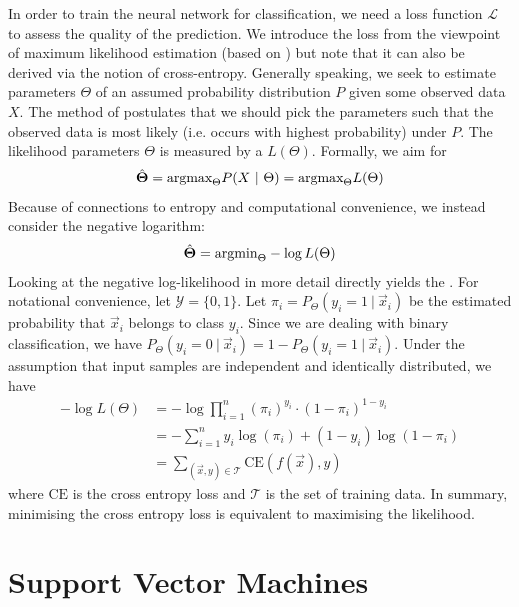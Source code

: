 \documentclass[
	fontsize=10pt, %
	twoside=false, %
	secnumdepth=1, %
  toc=indentunnumbered %
]{kaobook}
\begin{document}
In order to train the neural network for classification, we need a loss function
$\mathcal{L}$ to assess the quality of the prediction. We introduce the
 loss from the viewpoint of maximum likelihood
estimation (based on \cite{zhang_dive_nodate}) but note that it can also be
derived via the notion of cross-entropy.
%
Generally speaking, we seek to estimate parameters $\Theta$ of an assumed
probability distribution $P$ given some observed data $X$. The method of
 postulates that we should pick the
parameters such that the observed data is most likely (i.e. occurs with highest
probability) under $P$. The likelihood \wrt parameters $\Theta$ is measured by
a  $L(\Theta)$.
Formally, we aim for
\begin{align}
  \hat \Theta = \argmax_\Theta P(X~|~\Theta) = \argmax_\Theta L(\Theta)
\end{align}
Because of connections to entropy and computational convenience, we instead
consider the negative logarithm:
\begin{align}
  \hat \Theta = \argmin_\Theta -\log L(\Theta)
\end{align}
Looking at the negative log-likelihood in more detail directly yields the
.
For notational convenience, let $\mathcal{Y} =
\{0,1\}$. Let $\pi_i = P_\Theta(y_i=1~|~\vec x_i)$ be the estimated probability
that $\vec x_i$ belongs to class $y_i$. Since we are dealing with binary
classification, we have $P_\Theta(y_i=0~|~\vec x_i) = 1 - P_\Theta(y_i=1~|~\vec
x_i)$. Under the assumption that input samples are independent and identically
distributed, we have
\begin{align*}
  -\log L(\Theta)  &= -\log \prod_{i=1}^n (\pi_i)^{y_i} \cdot (1-\pi_i)^{1-y_i} \\
  &= - \sum_{i=1}^n y_i \log(\pi_i) + (1-y_i) \log(1-\pi_i) \\
  &= \sum_{(\vec x,y) \in \mathcal{T}} \text{CE}(f(\vec x), y)
    \label{eq:bce-loss-basic}
\end{align*}
where $\text{CE}$ is the cross entropy loss and $\mathcal{T}$ is the
set of training data. In summary, minimising the cross entropy loss is
equivalent to maximising the likelihood.


\section{Support Vector Machines}
\end{document}
